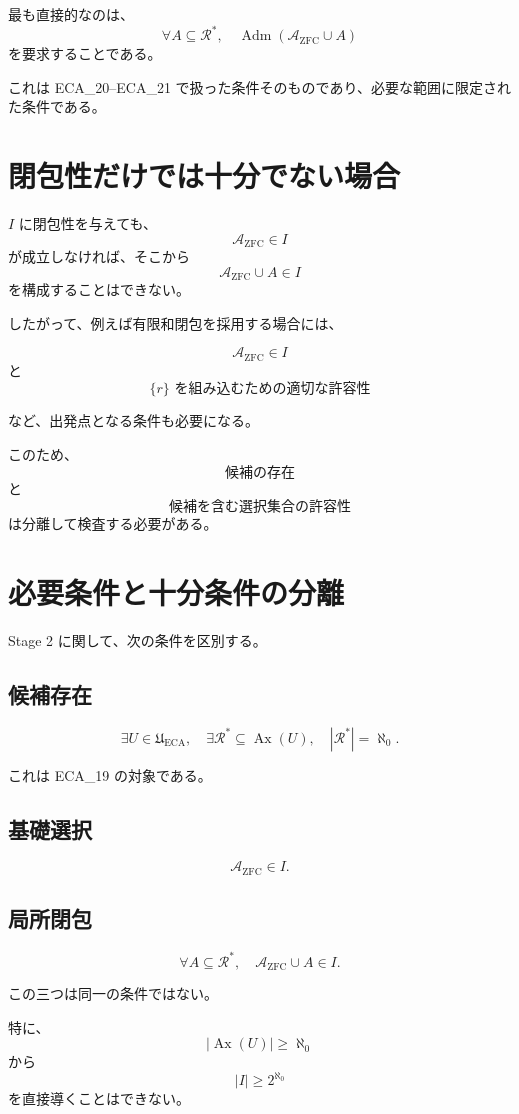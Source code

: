 \documentclass[a4paper,11pt]{ltjsarticle}
\begin{document}
最も直接的なのは、
\[
\boxed{
\forall A\subseteq\mathcal{R}^*,
\quad
\operatorname{Adm}
(\mathcal{A}_{\mathrm{ZFC}}\cup A)
}
\]
を要求することである。

これは ECA_20--ECA_21 で扱った条件そのものであり、必要な範囲に限定された条件である。

\section{閉包性だけでは十分でない場合}

$I$ に閉包性を与えても、
\[
\mathcal{A}_{\mathrm{ZFC}}\in I
\]
が成立しなければ、そこから
\[
\mathcal{A}_{\mathrm{ZFC}}\cup A\in I
\]
を構成することはできない。

したがって、例えば有限和閉包を採用する場合には、

\[
\mathcal{A}_{\mathrm{ZFC}}\in I
\]
と
\[
\{r\}\text{ を組み込むための適切な許容性}
\]

など、出発点となる条件も必要になる。

このため、
\[
\text{候補の存在}
\]
と
\[
\text{候補を含む選択集合の許容性}
\]
は分離して検査する必要がある。

\section{必要条件と十分条件の分離}

Stage 2 に関して、次の条件を区別する。

\subsection*{候補存在}
\[
\exists U\in\mathfrak U_{\mathrm{ECA}},
\quad
\exists\mathcal{R}^*
\subseteq\operatorname{Ax}(U),
\quad
|\mathcal{R}^*|=\aleph_0.
\]

これは ECA_19 の対象である。

\subsection*{基礎選択}
\[
\mathcal{A}_{\mathrm{ZFC}}\in I.
\]

\subsection*{局所閉包}
\[
\forall A\subseteq\mathcal{R}^*,
\quad
\mathcal{A}_{\mathrm{ZFC}}\cup A\in I.
\]

この三つは同一の条件ではない。

特に、
\[
|\operatorname{Ax}(U)|\ge\aleph_0
\]
から
\[
|I|\ge2^{\aleph_0}
\]
を直接導くことはできない。
\end{document}
